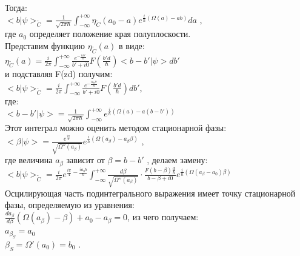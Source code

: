 \documentclass[11pt]{report}
\begin{document}
Тогда: \\

$<b|\psi>_{\tilde C} = \frac{1}{\sqrt{2\pi \hbar}} \int_{-∞}^{+∞} \eta_{\tilde C } (a_0-a)e^{\frac{i}{\hbar}(\Omega(a) - ab )}da$ ,\\

где $a_0$ определяет положение края полуплоскости.\\

Представим функцию $\eta_{\tilde C }(a)$ в виде: \\

 $\eta_{\tilde C }(a) = \frac{i}{2\pi } \int_{-∞}^{+∞}  \frac{e^{-\frac{iab'}{\hbar}} }{b'+i0 }F(\frac{b'd}{\hbar })<b-b'|\psi>db'$ \\

и подставляя F(zd) получим: \\

$<b|\psi>_{\tilde C} = \frac{i}{2\pi} \int_{-∞}^{+∞} \frac{e^{-\frac{ia_0b'}{\hbar}} }{b'+i0}F(\frac{b'd}{\hbar})db' $, \\

где: \\

$<b-b'|\psi > = \frac{1}{\sqrt{2\pi \hbar }}\int_{-∞}^{+∞} e^{\frac{i}{\hbar }(\Omega(a) - a(b-b'))} $ \\

Этот интеграл можно оценить методом стационарной фазы: \\

$<\beta | \psi>= \frac{e^\frac{{i\pi}}{4}}{\sqrt{\Omega''(a_\beta)}} e^{\frac{i}{\hbar}(\Omega(a_\beta) - a_\beta\beta)}$ ,\\

где величина $a_{\beta}$ зависит от $\beta = b-b'$ , делаем замену: \\

$<b|\psi>_{\tilde C} = \frac{i}{2\pi}e^{\frac{i\pi }{4} - \frac{ia_0b}{\hbar}}\int_{-∞}^{+∞} \frac{d\beta }{\sqrt{\Omega''(a_\beta)}} \cdot \frac{F(b-\beta)\frac{d}{\hbar}}{b-\beta+i0}e^{\frac{i}{\hbar }(\Omega(a_\beta - a_0)\beta )}$ \\

Осцилирующая часть подинтегрального выражения имеет точку стационарной фазы, определяемую из уравнения: \\

$\frac{da_\beta}{d\beta }(\Omega(a_\beta)-\beta) + a_0 - a_\beta = 0 $, из чего получаем: \\

$a_{\beta_S} = a_0$ \\
$\beta_S = \Omega'(a_0) = b_0$ .\\
\end{document}
